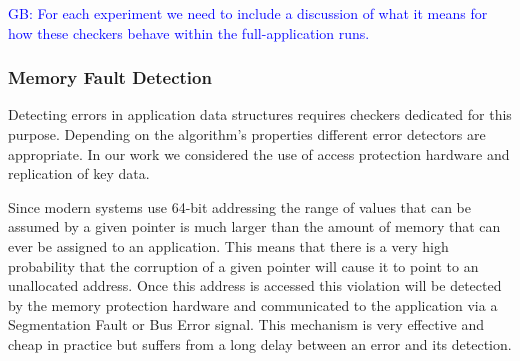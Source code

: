 \documentclass{sig-alternate}
\newcommand{\greg}[1]{%
  \textcolor{blue}{GB: #1}
}
\begin{document}
\greg{For each experiment we need to include a discussion of what it means for how these checkers behave within the full-application runs.}




\subsubsection{Memory Fault Detection}
\label{sec:res_tech:err_det:mem}

Detecting errors in application data structures requires checkers dedicated for this purpose.
Depending on the algorithm's properties different error detectors are appropriate.
In our work we considered the use of access protection hardware and replication of key data.

Since modern systems use 64-bit addressing the range of values that can be assumed by a given pointer is much larger than the amount of memory that can ever be assigned to an application.
This means that there is a very high probability that the corruption of a given pointer will cause it to point to an unallocated address.
Once this address is accessed this violation will be detected by the memory protection hardware and communicated to the application via a Segmentation Fault or Bus Error signal.
This mechanism is very effective and cheap in practice but suffers from a long delay between an error and its detection.
\end{document}
